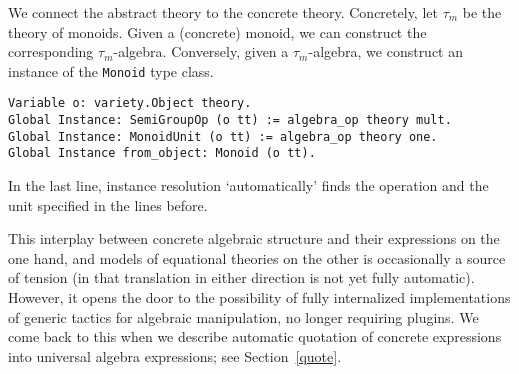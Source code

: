 \documentclass[a4paper,10pt,runningheads]{llncs}
\begin{document}

\begin{comment}
Given a sub\emph{set} of an algebra, we define the sub\emph{algebra} generated by it.
An interesting fact to mention is the use of the following heterogeneous equality between
elements of the algebra and of the subalgebra, i.e.\ terms of different types may be equal.
\begin{lstlisting}
  Fixpoint heq {o}: op_type carrier o -> op_type v o -> Prop :=
    match o with
    | constant x => fun a b => `a == b
    | function x y => fun a b => forall u, heq (a u) (b (`u))
    end.
\end{lstlisting}
\end{comment}

We connect the abstract theory to the concrete theory. Concretely, let $\tau_m$ be the theory
of monoids. Given a (concrete) monoid, we can construct the corresponding $\tau_m$-algebra. 
Conversely, given a $\tau_m$-algebra, we construct an instance of the \lstinline|Monoid| type class.
\begin{lstlisting}
Variable o: variety.Object theory.
Global Instance: SemiGroupOp (o tt) := algebra_op theory mult.
Global Instance: MonoidUnit (o tt) := algebra_op theory one.
Global Instance from_object: Monoid (o tt).
\end{lstlisting}

In the last line, instance resolution `automatically' finds the operation and the unit specified in
the lines before.

This interplay between concrete algebraic structure and their expressions on the one hand, and models of equational theories on the other is occasionally a source of tension (in that translation in either direction is not yet fully automatic). However, it opens the door to the possibility of fully internalized implementations of generic tactics for algebraic manipulation, no longer requiring plugins. We come back to this when we describe automatic quotation of concrete expressions into universal algebra expressions; see Section~\ref{quote}.
\end{document}
